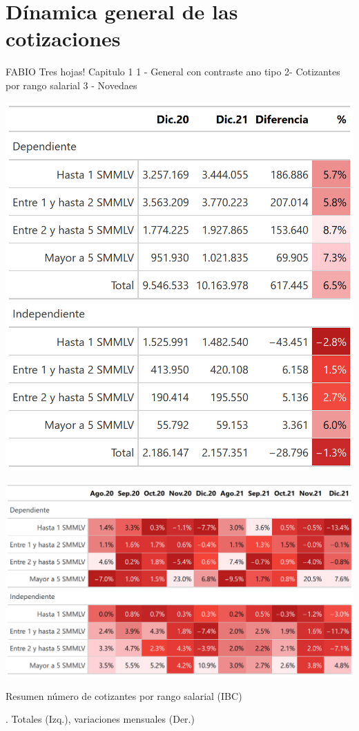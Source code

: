 \section{Dínamica general de las cotizaciones}


FABIO 
Tres hojas!  Capitulo 1 
1 - General con contraste ano tipo
2- Cotizantes por rango salarial
3 - Novedaes


\lipsum[2-3] %

\begin{table}[!h]
\centering
\begin{minipage}{0.5\textwidth}
  \centering
  \includegraphics[width=0.6\linewidth]{results/Resumen/salida_table3_total.png}
\end{minipage}%
\begin{minipage}{0.5\textwidth}
  \centering
  \includegraphics[width=\linewidth]{results/Resumen/salida_table3_variaciones.png}
\end{minipage}
\caption{Resumen número de cotizantes por rango salarial (IBC)}. Totales (Izq.), variaciones mensuales (Der.)
\label{tabla:tabla3}
\end{table}
\lipsum[2-3] %
